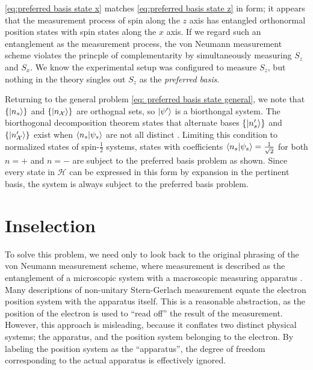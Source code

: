 \autoref{eq:preferred basis state x} matches \autoref{eq:preferred basis state z} in form; it appears that the measurement process of spin along the $z$ axis has entangled orthonormal position states with spin states along the $x$ axis. If we regard such an entanglement as the measurement process, the von Neumann measurement scheme violates the princple of complementarity by simultaneously measuring $S_z$ and $S_x$. We know the experimental setup was configured to measure $S_z$, but nothing in the theory singles out $S_z$ as the \textit{preferred basis}.

Returning to the general problem \autoref{eq: preferred basis state general}, we note that $\{ \ket{n_s} \}$ and $\{ \ket{n_\mathcal{X}} \}$ are orthognal sets, so $\ket{\psi'}$ is a biorthongal system. The biorthogonal decomposition theorem states that alternate bases $\{ \ket{n'_s} \}$ and $\{ \ket{n'_\mathcal{X}} \}$ exist when $\braket{n_s | \psi_s}$ are not all distinct \cite{Elby}. Limiting this condition to normalized states of spin-$\frac{1}{2}$ systems, states with coefficients $\braket{n_s | \psi_s} = \frac{1}{\sqrt{2}}$ for both $n = +$ and $n = -$ are subject to the preferred basis problem as shown. Since every state in $\mathcal{H}$ can be expressed in this form by expansion in the pertinent basis, the system is always subject to the preferred basis problem.

\section{Inselection}

To solve this problem, we need only to look back to the original phrasing of the von Neumann measurement scheme, where measurement is described as the entanglement of a microscopic system with a macroscopic measuring apparatus \cite{Neumann}. Many descriptions of non-unitary Stern-Gerlach measurement equate the electron position system with the apparatus itself\cite{Venugopalan}. This is a reasonable abstraction, as the position of the electron is used to ``read off'' the result of the measurement. However, this approach is misleading, because it conflates two distinct physical systems; the apparatus, and the position system belonging to the electron. By labeling the position system as the ``apparatus'', the degree of freedom corresponding to the actual apparatus is effectively ignored.

